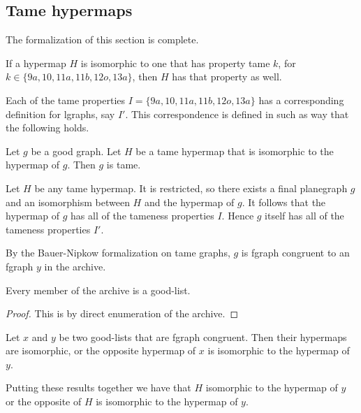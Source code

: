 \subsection{Tame hypermaps}

The formalization of this section is complete.

\begin{lemma} 
If a hypermap $H$ is isomorphic to one that has property
tame $k$, for $k\in \{9a, 10, 11a, 11b, 12o, 13a\}$, then
$H$ has that property as well.
\end{lemma} 

Each of the tame properties $I=\{9a,10,11a,11b,12o,13a\}$ has
a corresponding definition for lgraphs, say $I'$.  This correspondence is
defined in such as way that the following holds.

\begin{lemma}  Let $g$ be a good graph.  
Let $H$ be a tame hypermap that is isomorphic to the hypermap of $g$.
Then $g$ is tame.
\end{lemma} 

Let $H$ be any tame hypermap.  It is restricted, so there exists
a final planegraph $g$ and an isomorphism between $H$ and the
hypermap of $g$.  It follows that the hypermap of $g$ has all of
the tameness properties $I$.  Hence $g$ itself has all of the tameness
properties $I'$.  

By the Bauer-Nipkow formalization on tame graphs, $g$ is 
fgraph congruent
to an fgraph $y$ in the archive.

\begin{lemma}
 Every member of the archive 
is a good-list.
\end{lemma} 

\begin{proof} This is by direct enumeration of the archive.
\end{proof}

\begin{lemma}
Let $x$ and $y$ be two good-lists that are fgraph congruent.
Then their hypermaps are isomorphic, or the opposite hypermap of $x$
is isomorphic to the hypermap of $y$.
\end{lemma} 

Putting these results together we have that $H$ isomorphic to the
hypermap of $y$ or the opposite of $H$ is isomorphic to the hypermap
of $y$.

